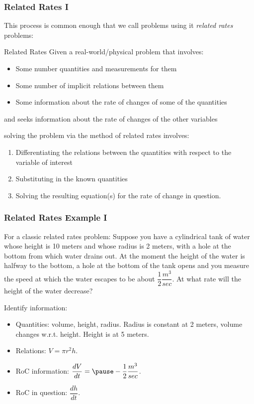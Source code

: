 \documentclass{ltx-talk}
\begin{document}
\begin{frame}
  \frametitle{Related Rates I}

  This process is common enough that we call problems using it \textit{related rates} problems: \pause

  \begin{block}{Related Rates}
    Given a real-world/physical problem that involves:
    \begin{itemize}
      \item Some number quantities and measurements for them \pause
      \item Some number of implicit relations between them \pause
      \item Some information about the rate of changes of some of the quantities \pause
    \end{itemize}
    and seeks information about the rate of changes of the other variables \pause

    solving the problem via the method of related rates involves: \pause
    \begin{enumerate}
      \item Differentiating the relations between the quantities with respect to the variable of interest \pause
      \item Substituting in the known quantities \pause
      \item Solving the resulting equation(s) for the rate of change in question.
    \end{enumerate}
  \end{block}
\end{frame}

\begin{frame}
  \frametitle{Related Rates Example I}
  For a classic related rates problem:
  Suppose you have a cylindrical tank of water whose height is 10 meters and whose radius is 2 meters,
  with a hole at the bottom from which water drains out.
  At the moment the height of the water is halfway to the bottom, a hole at the bottom of the tank opens and you measure the 
  speed at which the water escapes to be about $\dfrac{1}{2} \dfrac{m^3}{sec}$.
  At what rate will the height of the water decrease? \pause

  Identify information:
  \begin{itemize}
    \item Quantities: \pause volume, height, radius. \pause Radius is constant at 2 meters, volume changes w.r.t. height. \pause Height is at 5 meters.
    \item Relations: \pause $V = \pi r^2 h$. \pause
    \item RoC information: \pause $\dfrac{dV}{dt} = \pause - \dfrac{1}{2} \dfrac{m^3}{sec}$.
    \item RoC in question: \pause $\dfrac{dh}{dt}$.
  \end{itemize}
\end{frame}
\end{document}

